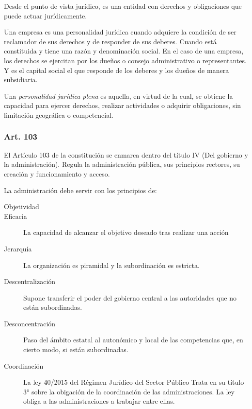     Desde el punto de vista jurídico, es una entidad con derechos y obligaciones que puede actuar jurídicamente.

    Una empresa es una personalidad jurídica cuando adquiere la condición de ser reclamador de sus derechos y de responder de sus deberes. Cuando está constituida y tiene una razón y denominación social. En el caso de una empresa, los derechos se ejercitan por los dueños o consejo administrativo o representantes. Y es el capital social el que responde de los deberes y los dueños de manera subsidiaria.

    Una \textit{personalidad jurídica plena} es aquella, en virtud de la cual, se obtiene la capacidad para ejercer derechos, realizar actividades o adquirir obligaciones, sin limitación geográfica o competencial.

\subsubsection{Art. 103}
    El Artículo 103 de la constitución se enmarca dentro del título IV (Del gobierno y la administración). Regula la administración pública, sus principios rectores, su creación y funcionamiento y acceso.

    La administración debe servir con los principios de:
    \begin{description}
        \item[Objetividad]
        \item[Eficacia] La capacidad de alcanzar el objetivo deseado tras realizar una acción
        \item[Jerarquía] La organización es piramidal y la subordinación es estricta.
        \item[Descentralización] Supone transferir el poder del gobierno central a las autoridades que no están subordinadas.
        \item[Desconcentración] Paso del ámbito estatal al autonómico y local de las competencias que, en cierto modo, si están subordinadas.
        \item[Coordinación] La ley 40/2015 del Régimen Jurídico del Sector Público Trata en su título 3° sobre la obigación de la coordinación de las administraciones. La ley obliga a las administraciones a trabajar entre ellas.
    \end{description}

    \noindent{}

